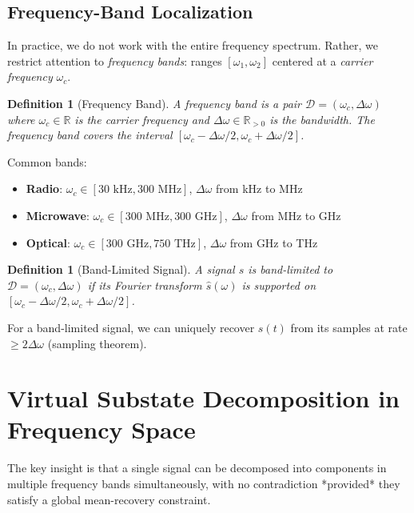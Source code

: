 \documentclass[twocolumn,11pt,a4paper]{article}
\newtheorem{definition}[theorem]{Definition}
\newcommand{\signal}{s}
\newcommand{\bandwidth}{\Delta\omega}
\newcommand{\domain}{\mathcal{D}}
\newcommand{\freq}{\omega}
\begin{document}
\subsection{Frequency-Band Localization}

In practice, we do not work with the entire frequency spectrum. Rather, we restrict attention to \emph{frequency bands}: ranges $[\freq_1, \freq_2]$ centered at a \emph{carrier frequency} $\freq_c$.

\begin{definition}[Frequency Band]
A \emph{frequency band} is a pair $\domain = (\freq_c, \bandwidth)$ where $\freq_c \in \mathbb{R}$ is the \emph{carrier frequency} and $\bandwidth \in \mathbb{R}_{>0}$ is the \emph{bandwidth}. The frequency band covers the interval $[\freq_c - \bandwidth/2, \freq_c + \bandwidth/2]$.
\end{definition}

Common bands:
\begin{itemize}[nosep]
  \item \textbf{Radio}: $\freq_c \in [30\text{ kHz}, 300\text{ MHz}]$, $\bandwidth$ from kHz to MHz
  \item \textbf{Microwave}: $\freq_c \in [300\text{ MHz}, 300\text{ GHz}]$, $\bandwidth$ from MHz to GHz
  \item \textbf{Optical}: $\freq_c \in [300\text{ GHz}, 750\text{ THz}]$, $\bandwidth$ from GHz to THz
\end{itemize}

\begin{definition}[Band-Limited Signal]
A signal $\signal$ is \emph{band-limited to} $\domain = (\freq_c, \bandwidth)$ if its Fourier transform $\hat{\signal}(\freq)$ is supported on $[\freq_c - \bandwidth/2, \freq_c + \bandwidth/2]$.
\end{definition}

For a band-limited signal, we can uniquely recover $\signal(t)$ from its samples at rate $\geq 2\bandwidth$ (sampling theorem).

\section{Virtual Substate Decomposition in Frequency Space}
\label{sec:virt_freq}

The key insight is that a single signal can be decomposed into components in multiple frequency bands simultaneously, with no contradiction *provided* they satisfy a global mean-recovery constraint.
\end{document}
